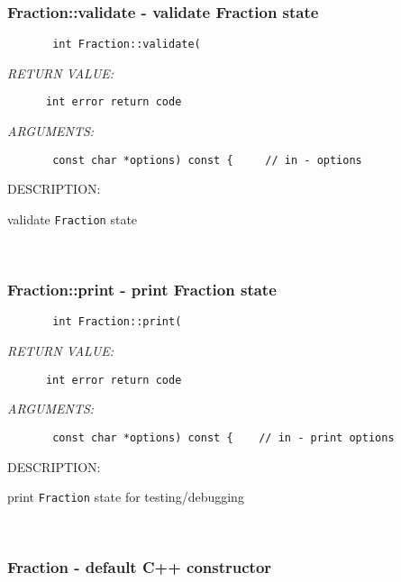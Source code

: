 \subsubsection [Fraction::validate] {Fraction::validate - validate Fraction state}


  
\begin{verbatim}       int Fraction::validate(\end{verbatim}{\em RETURN VALUE:}
\begin{verbatim}      int error return code\end{verbatim}{\em ARGUMENTS:}
\begin{verbatim}       const char *options) const {     // in - options\end{verbatim}
{\sf DESCRIPTION:\\ }


        validate {\tt Fraction} state
   
 
\mbox{}\hrulefill\ 
 
\subsubsection [Fraction::print] {Fraction::print - print Fraction state}


  
\begin{verbatim}       int Fraction::print(\end{verbatim}{\em RETURN VALUE:}
\begin{verbatim}      int error return code\end{verbatim}{\em ARGUMENTS:}
\begin{verbatim}       const char *options) const {    // in - print options\end{verbatim}
{\sf DESCRIPTION:\\ }


        print {\tt Fraction} state for testing/debugging
   
 
\mbox{}\hrulefill\ 
 
\subsubsection [Fraction] {Fraction - default C++ constructor}


